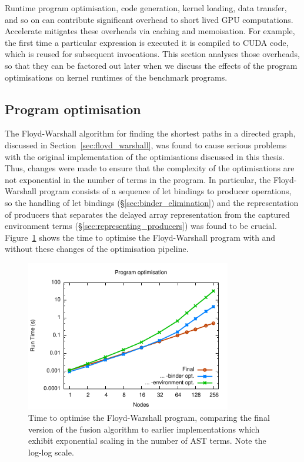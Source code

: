 Runtime program optimisation, code generation, kernel loading, data transfer,
and so on can contribute significant overhead to short lived GPU computations.
Accelerate mitigates these overheads via caching and memoisation. For example,
the first time a particular expression is executed it is compiled to CUDA code,
which is reused for subsequent invocations. This section analyses those
overheads, so that they can be factored out later when we discuss the effects of
the program optimisations on kernel runtimes of the benchmark programs.


\subsection{Program optimisation}

The Floyd-Warshall algorithm for finding the shortest paths in a directed graph,
discussed in Section~\ref{sec:floyd_warshall}, was found to cause serious
problems with the original implementation of the optimisations discussed in this
thesis. Thus, changes were made to ensure that the complexity of the
optimisations are not exponential in the number of terms in the program. In
particular, the Floyd-Warshall program consists of a sequence of let bindings to
producer operations, so the handling of let bindings
(\S\ref{sec:binder_elimination}) and the representation of producers that
separates the delayed array representation from the captured environment terms
(\S\ref{sec:representing_producers}) was found to be crucial.
Figure~\ref{fig:convertAcc} shows the time to optimise the Floyd-Warshall
program with and without these changes of the optimisation pipeline.

\begin{figure}
    \begin{center}
        \includegraphics[width=0.8\textwidth]{images/results/convertAcc/convertAcc}
    \end{center}
    \caption[Program optimisation runtimes]{Time to optimise the Floyd-Warshall
        program, comparing the final version of the fusion algorithm to earlier
        implementations which exhibit exponential scaling in the number of AST
        terms. Note the log-log scale.}
    \label{fig:convertAcc}
\end{figure}

